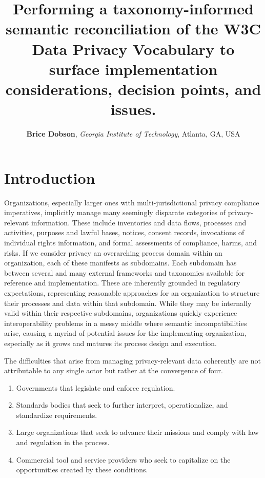 \documentclass[10pt,letterpaper,twocolumn,twoside]{rho-class/rho}
\title{\textbf{Performing a taxonomy-informed semantic reconciliation of the W3C Data Privacy Vocabulary to surface implementation considerations, decision points, and issues.}}
\author[{\textasteriskcentered},a,1]{\textbf{Brice Dobson}, \textit{Georgia Institute of Technology}, Atlanta, GA, USA}
\begin{document}
\setcounter{page}{1}

    \maketitle
    \thispagestyle{firststyle}

\hypertarget{toc}{}
\setcounter{tocdepth}{2}
\tableofcontents
\label{sec:0}
\clearpage
\section{Introduction}\label{sec:intro}
Organizations, especially larger ones with multi-jurisdictional privacy compliance imperatives, implicitly manage many seemingly disparate categories of privacy-relevant information. These include inventories and data flows, processes and activities, purposes and lawful bases, notices, consent records, invocations of individual rights information, and formal assessments of compliance, harms, and risks. If we consider privacy an overarching process domain within an organization, each of these manifests as subdomains. Each subdomain has between several and many external frameworks and taxonomies available for reference and implementation. These are inherently grounded in regulatory expectations, representing reasonable approaches for an organization to structure their processes and data within that subdomain. While they may be internally valid within their respective subdomains, organizations quickly experience interoperability problems in a messy middle where semantic incompatibilities arise, causing a myriad of potential issues for the implementing organization, especially as it grows and matures its process design and execution. 

The difficulties that arise from managing privacy-relevant data coherently are not attributable to any single actor but rather at the convergence of four. 
\begin{enumerate}
    \item Governments that legislate and enforce regulation.
    \item Standards bodies that seek to further interpret, operationalize, and standardize requirements.
    \item Large organizations that seek to advance their missions and comply with law and regulation in the process.
    \item Commercial tool and service providers who seek to capitalize on the opportunities created by these conditions.
\end{enumerate}
\end{document}

